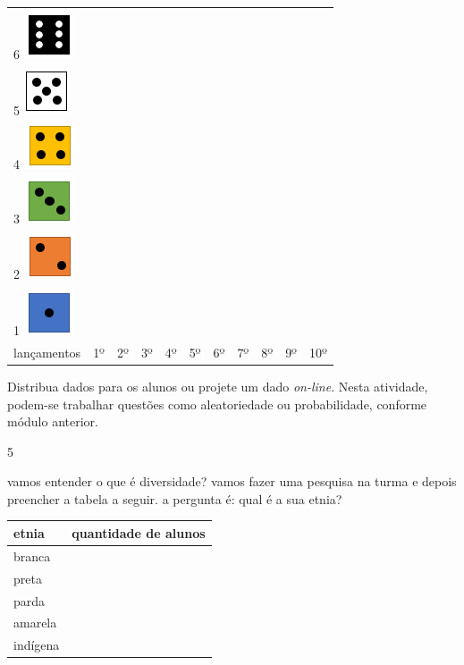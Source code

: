 \begin{longtable}[]{@{}lllllllllll@{}}
\toprule
6 \includegraphics[width=0.56258in,height=0.57300in]{media/image98.png}
& & & & & & & & & &\tabularnewline
5 \includegraphics[width=0.53132in,height=0.55216in]{media/image99.png}
& & & & & & & & & &\tabularnewline
4 \includegraphics[width=0.61467in,height=0.53132in]{media/image100.png}
& & & & & & & & & &\tabularnewline
3 \includegraphics[width=0.56258in,height=0.53132in]{media/image101.png}
& & & & & & & & & &\tabularnewline
2 \includegraphics[width=0.57300in,height=0.54174in]{media/image102.png}
& & & & & & & & & &\tabularnewline
1 \includegraphics[width=0.58341in,height=0.55216in]{media/image103.png}
& & & & & & & & & &\tabularnewline
lançamentos & 1º & 2º & 3º & 4º & 5º & 6º & 7º & 8º & 9º &
10º\tabularnewline
\bottomrule
\end{longtable}

Distribua dados para os alunos ou projete um dado
\textit{on-line}. Nesta atividade, podem-se trabalhar questões como
aleatoriedade ou probabilidade, conforme módulo anterior.

\num{5}

vamos entender o que é diversidade? vamos fazer uma pesquisa na turma e
depois preencher a tabela a seguir. a pergunta é: qual é a sua etnia?

\begin{longtable}[]{@{}ll@{}}
\toprule
etnia & quantidade de alunos\tabularnewline
\midrule
\endhead
branca &\tabularnewline
preta &\tabularnewline
parda &\tabularnewline
amarela &\tabularnewline
indígena &\tabularnewline
\bottomrule
\end{longtable}

